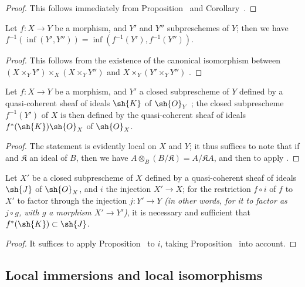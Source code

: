 \begin{proof}
This follows immediately from Proposition~ and Corollary~.
\end{proof}

\begin{corollary}[4.4.4]
\label{I.4.4.4}
Let $f:X\to Y$ be a morphism, and $Y'$ and $Y''$ subpreschemes of $Y$;
then we have $f^{-1}(\inf(Y',Y''))=\inf(f^{-1}(Y'),f^{-1}(Y''))$.
\end{corollary}

\begin{proof}
This follows from the existence of the canonical isomorphism between $(X\times_Y Y')\times_X(X\times_Y Y'')$ and $X\times_Y(Y'\times_Y Y'')$ .
\end{proof}

\begin{proposition}[4.4.5]
\label{I.4.4.5}
Let $f:X\to Y$ be a morphism, and $Y'$ a closed subprescheme of $Y$ defined by a quasi-coherent sheaf of ideals $\sh{K}$ of $\sh{O}_Y$ ;
the closed subprescheme $f^{-1}(Y')$ of $X$ is then defined by the quasi-coherent sheaf of ideals $f^*(\sh{K})\sh{O}_X$ of $\sh{O}_X$.
\end{proposition}

\begin{proof}
The statement is evidently local on $X$ and $Y$;
it thus suffices to note that if  and $\mathfrak{K}$ an ideal of $B$, then we have $A\otimes_B(B/\mathfrak{K})=A/\mathfrak{K}A$, and then to apply .
\end{proof}

\begin{corollary}[4.4.6]
\label{I.4.4.6}
Let $X'$ be a closed subprescheme of $X$ defined by a quasi-coherent sheaf of ideals $\sh{J}$ of $\sh{O}_X$, and $i$ the injection $X'\to X$;
for the restriction $f\circ i$ of $f$ to $X'$ to factor through the injection $j:Y'\to Y$ \emph{(in other words, for it to factor as $j\circ g$, with $g$ a morphism $X'\to Y'$)}, it is necessary and sufficient that $f^*(\sh{K})\subset\sh{J}$.
\end{corollary}

\begin{proof}
It suffices to apply Proposition~ to $i$, taking Proposition~ into account.
\end{proof}

\subsection{Local immersions and local isomorphisms}
\label{subsection:I.4.5}

